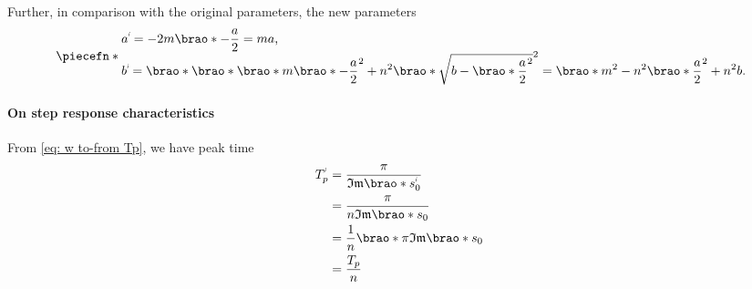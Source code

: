\documentclass[12pt]{article}
\DeclarePairedDelimiter\brao()%
\DeclarePairedDelimiter\abs||
\DeclarePairedDelimiter\piecefn\{.
\newcommand{\setprime}[2][1]{%
    {#2}^{%
        \raisebox{1pt}{%
            \scalebox{0.5}{%
                \itshape\sffamily\uppercase%
                \expandafter{%
                    \romannumeral#1%
                }%
            }%
        }
    }%
}%
\begin{document}
\begin{enumerate}[(a)]
        Further, in comparison with the original parameters,
        the new parameters
        \begin{equation}
            \piecefn*{
                \begin{array}{@{}l@{}}\displaystyle
                      \setprime{a}
                    = -2m\brao*{-\frac{a}2}
                    = ma
                    \rlap,
                \\*\displaystyle
                      \setprime{b}
                    = \brao*{\brao*{\brao*m\brao*{-\frac{a}2}}^2 + n^2\brao*{\sqrt{b - \brao*{\frac{a}2}^2}}^2}
                    = \brao*{m^2 - n^2}\brao*{\frac{a}2}^2 + n^2 b
                    \rlap.
                \\*
                \end{array}
            }
        \end{equation}

        \paragraph{On step response characteristics}
        From \eqref{eq: w to-from Tp}, we have peak time
        \begin{equation}\label{eq:peak time, m, n}
            \begin{aligned}
                      \setprime{T}_p
                &{} = \frac\pi{\mathfrak{Im}\brao*{\setprime{s}_0}}
            \\*
                &{} = \frac\pi{n\mathfrak{Im}\brao*{s_0}}
            \\*
                &{} = \frac1n\brao*{\pi{\mathfrak{Im}\brao*{s_0}}}
            \\*
                &{} = \frac{T_p}n
            \\*
            \end{aligned}
        \end{equation}


\end{enumerate}
\end{document}
